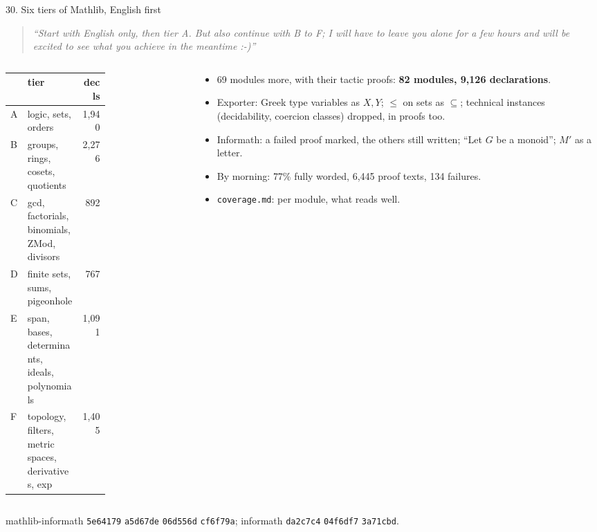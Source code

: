 \documentclass[10pt,aspectratio=169]{beamer}
\newcommand{\ok}[1]{\textcolor{good}{#1}}
\newcommand{\commit}[1]{\texttt{\footnotesize #1}}
\newcommand{\prompt}[1]{\begin{quote}\small\itshape ``#1''\end{quote}}
\begin{document}
\begin{frame}{30. Six tiers of Mathlib, English first}
  \footnotesize
  \prompt{Start with English only, then tier A. But also continue with B to F; I will have to
  leave you alone for a few hours and will be excited to see what you achieve in the meantime :-)}
  \begin{columns}[T]
    \begin{column}{0.5\textwidth}
      \scriptsize
      \begin{tabular}{@{}l>{\raggedright\arraybackslash}p{0.55\linewidth}r@{}}
        \toprule
        & tier & decls \\
        \midrule
        A & logic, sets, orders & 1,940 \\
        B & groups, rings, cosets, quotients & 2,276 \\
        C & gcd, factorials, binomials, ZMod, divisors & 892 \\
        D & finite sets, sums, pigeonhole & 767 \\
        E & span, bases, determinants, ideals, polynomials & 1,091 \\
        F & topology, filters, metric spaces, derivatives, exp & 1,405 \\
        \bottomrule
      \end{tabular}
    \end{column}
    \begin{column}{0.48\textwidth}
      \begin{itemize}
        \item 69 modules more, with their tactic proofs: \textbf{82 modules, 9,126 declarations}.
        \item Exporter: Greek type variables as $X, Y$; $\leq$ on sets as $\subseteq$; technical
              instances (decidability, coercion classes) dropped, in proofs too.
        \item Informath: a failed proof marked, the others still written; ``Let $G$ be a
              monoid''; $M'$ as a letter.
        \item By morning: \ok{77\%} fully worded, \ok{6,445 proof texts}, 134 failures.
        \item \texttt{coverage.md}: per module, what reads well.
      \end{itemize}
    \end{column}
  \end{columns}
  \vspace{1mm}
  mathlib-informath \commit{5e64179} \commit{a5d67de} \commit{06d556d} \commit{cf6f79a};
  informath \commit{da2c7c4} \commit{04f6df7} \commit{3a71cbd}.
\end{frame}
\end{document}
